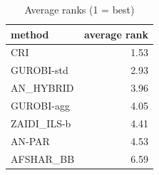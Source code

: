 \begin{table}[htbp]
\centering
\small
\caption{Average ranks (1 = best)}
\label{tab:E10b_state_of_the_art_60s_b60_ranks}
\begin{tabular}{lr}
\toprule
method & average rank \\
\midrule
CRI & 1.53 \\
GUROBI-std & 2.93 \\
AN\_HYBRID & 3.96 \\
GUROBI-agg & 4.05 \\
ZAIDI\_ILS-b & 4.41 \\
AN-PAR & 4.53 \\
AFSHAR\_BB & 6.59 \\
\bottomrule
\end{tabular}
\end{table}
